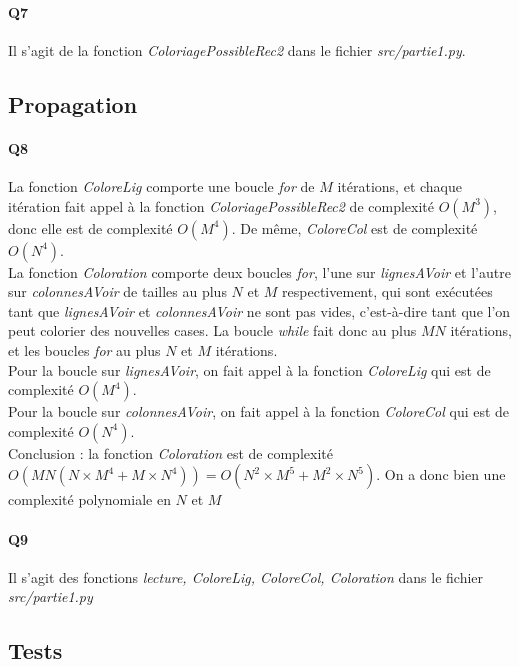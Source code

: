 \documentclass[12pt]{article}
\begin{document}
	\paragraph{Q7}
	
	Il s'agit de la fonction \textit{ColoriagePossibleRec2} dans le fichier \textit{src/partie1.py}.
	
	\subsection{Propagation}
	
	\paragraph{Q8}
	
	La fonction \textit{ColoreLig} comporte une boucle \textit{for} de $ M $ itérations, et chaque itération fait appel à la fonction \textit{ColoriagePossibleRec2} de complexité $ O(M^3) $, donc elle est de complexité $ O(M^4) $. De même, \textit{ColoreCol} est de complexité $ O(N^4) $. \\
	La fonction \textit{Coloration} comporte deux boucles \textit{for}, l'une sur \textit{lignesAVoir} et l'autre sur \textit{colonnesAVoir} de tailles au plus $ N $ et $ M $ respectivement, qui sont exécutées tant que \textit{lignesAVoir} et \textit{colonnesAVoir} ne sont pas vides, c'est-à-dire tant que l'on peut colorier des nouvelles cases. La boucle \textit{while} fait donc au plus $ MN $ itérations, et les boucles \textit{for} au plus $ N $ et $ M $ itérations. \\
	Pour la boucle sur \textit{lignesAVoir}, on fait appel à la fonction \textit{ColoreLig} qui est de complexité $ O(M^4) $. \\
	Pour la boucle sur \textit{colonnesAVoir}, on fait appel à la fonction \textit{ColoreCol} qui est de complexité $ O(N^4) $. \\
	Conclusion : la fonction \textit{Coloration} est de complexité $ O(MN(N \times M^4 + M \times N^4)) = \boxed{O(N^2 \times M^5 + M^2 \times N^5)} $. On a donc bien une complexité polynomiale en $ N $ et $ M $
	
	\paragraph{Q9}
	Il s'agit des fonctions \textit{lecture, ColoreLig, ColoreCol, Coloration} dans le fichier \textit{src/partie1.py}
	
	\subsection{Tests}
	
\end{document}

